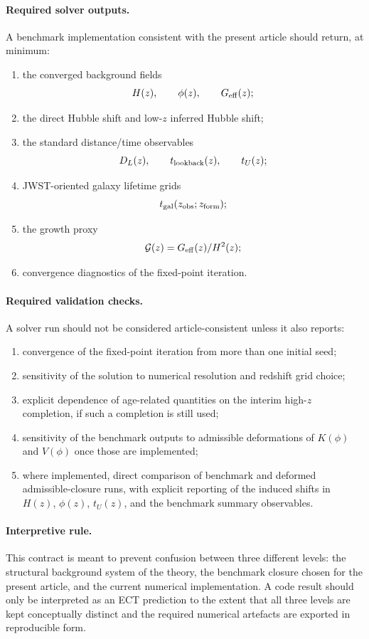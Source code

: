 \documentclass[11pt,a4paper]{article}
\numberwithin{equation}{section}
\begin{document}
\paragraph{Required solver outputs.}
A benchmark implementation consistent with the present article should
return, at minimum:
\begin{enumerate}
  \item the converged background fields
  \[
  H(z),\qquad \phi(z),\qquad G_{\rm eff}(z);
  \]
  \item the direct Hubble shift and low-$z$ inferred Hubble shift;
  \item the standard distance/time observables
  \[
  D_L(z),\qquad t_{\rm lookback}(z),\qquad t_U(z);
  \]
  \item JWST-oriented galaxy lifetime grids
  \[
  t_{\rm gal}(z_{\rm obs};z_{\rm form});
  \]
  \item the growth proxy
  \[
  \mathcal{G}(z)=G_{\rm eff}(z)/H^2(z);
  \]
  \item convergence diagnostics of the fixed-point iteration.
\end{enumerate}

\paragraph{Required validation checks.}
A solver run should not be considered article-consistent unless it also
reports:
\begin{enumerate}
  \item convergence of the fixed-point iteration from more than one
  initial seed;
  \item sensitivity of the solution to numerical resolution and redshift
  grid choice;
  \item explicit dependence of age-related quantities on the interim
  high-$z$ completion, if such a completion is still used;
  \item sensitivity of the benchmark outputs to admissible deformations
  of $K(\phi)$ and $V(\phi)$ once those are implemented;
  \item where implemented, direct comparison of benchmark and deformed
  admissible-closure runs, with explicit reporting of the induced shifts
  in $H(z)$, $\phi(z)$, $t_U(z)$, and the benchmark summary observables.
\end{enumerate}

\paragraph{Interpretive rule.}
This contract is meant to prevent confusion between three different
levels:
the structural background system of the theory,
the benchmark closure chosen for the present article,
and the current numerical implementation.
A code result should only be interpreted as an ECT prediction to the
extent that all three levels are kept conceptually distinct and the
required numerical artefacts are exported in reproducible form.
\end{document}
